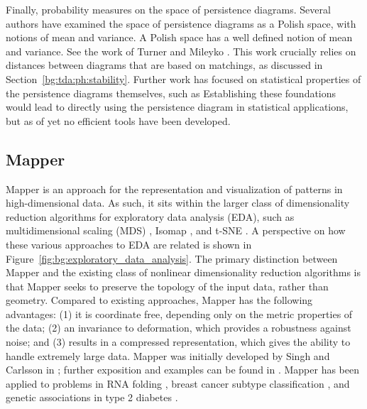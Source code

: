 Finally, probability measures on the space of persistence diagrams.
Several authors have examined the space of persistence diagrams as a Polish space, with notions of mean and variance.
A Polish space has a well defined notion of mean and variance.
See the work of Turner \cite{Turner:2012wb} and Mileyko \cite{Mileyko:2011jm}.
This work crucially relies on distances between diagrams that are based on matchings, as discussed in Section~\ref{bg:tda:ph:stability}.
Further work has focused on statistical properties of the persistence diagrams themselves, such as \cite{Chazal:2014vl}
Establishing these foundations would lead to directly using the persistence diagram in statistical applications, but as of yet no efficient tools have been developed.




\subsection{Mapper}
\label{bg:tda:mapper}

Mapper is an approach for the representation and visualization of patterns in high-dimensional data.
As such, it sits within the larger class of dimensionality reduction algorithms for exploratory data analysis (EDA), such as multidimensional scaling (MDS) \cite{Kruskal:1964}, Isomap \cite{Tenenbaum:2000vq}, and t-SNE \cite{VanderMaaten:2008tm}.
A perspective on how these various approaches to EDA are related is shown in Figure~\ref{fig:bg:exploratory_data_analysis}.
The primary distinction between Mapper and the existing class of nonlinear dimensionality reduction algorithms is that Mapper seeks to preserve the topology of the input data, rather than geometry.
Compared to existing approaches, Mapper has the following advantages: (1) it is coordinate free, depending only on the metric properties of the data; (2) an invariance to deformation, which provides a robustness against noise; and (3) results in a compressed representation, which gives the ability to handle extremely large data.
Mapper was initially developed by Singh and Carlsson in \cite{Singh:2007ve}; further exposition and examples can be found in \cite{Lum:2013cz}.
Mapper has been applied to problems in RNA folding \cite{Bowman:2008esa}, breast cancer subtype classification \cite{Nicolau:2011}, and genetic associations in type 2 diabetes \cite{Li:2015gl}.

